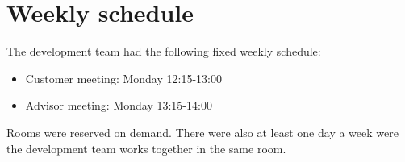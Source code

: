 

\section{Weekly schedule}

The development team had the following fixed weekly schedule:

\begin{itemize}
\item Customer meeting: Monday 12:15-13:00
\item Advisor meeting: Monday 13:15-14:00
\end{itemize}
Rooms were reserved on demand. There were also at least one day a week were the development team works together in the same room. 



